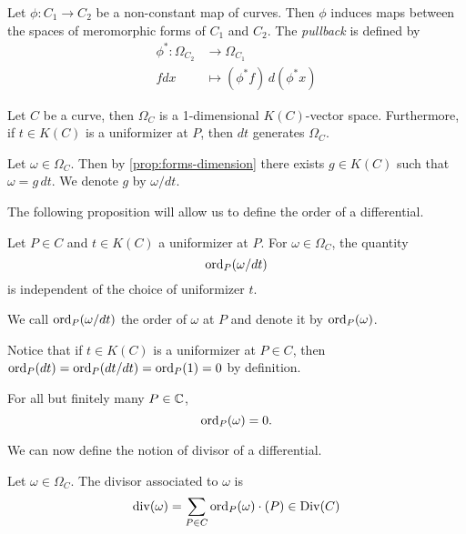 \begin{definition}
	Let $\phi: C_1 \to C_2$ be a non-constant map of curves. Then $\phi$ induces
	maps between the spaces of meromorphic forms of $C_1$ and $C_2$.
	The \emph{pullback} is defined by
	\begin{align*}
		\phi^*: \Omega_{C_2} &\to \Omega_{C_1}\\
		fdx &\mapsto (\phi^* f)\,d(\phi^* x)
	\end{align*}
\end{definition}

\begin{proposition}
	\label{prop:forms-dimension}
	Let $C$ be a curve, then $\Omega_C$ is a 1-dimensional $K(C)$-vector space.
	Furthermore, if $t \in K(C)$ is a uniformizer at $P$,
	then $dt$ generates $\Omega_C$.
\end{proposition}

\begin{notation}
	Let $\omega \in \Omega_C$. Then by \ref{prop:forms-dimension} there exists
	$g \in K(C)$ such that $\omega = g\,dt$. We denote $g$ by $\omega/dt$.
\end{notation}

The following proposition will allow us to define the order of a differential.
\begin{proposition}
	Let $P \in C$ and $t \in K(C)$ a uniformizer at $P$. For $\omega \in
	\Omega_C$,
	the quantity
	\begin{equation*}
		\operatorname{ord}_P(\omega/dt)
	\end{equation*}
	is independent of the choice of uniformizer $t$.
\end{proposition}

\begin{definition}
	We call $\operatorname{ord}_P(\omega/dt)$ the order of $\omega$ at $P$ and denote it by
	$\operatorname{ord}_P(\omega)$.
\end{definition}

Notice that if $t \in K(C)$ is a uniformizer at $P \in C$, then
$\operatorname{ord}_P(dt) = \operatorname{ord}_P(dt/dt) = \operatorname{ord}_P(1) = 0$ by definition.


\begin{proposition}
	For all but finitely many $P \in \mathbb{C}$, 
	\begin{equation*}
		\operatorname{ord}_P(\omega) = 0.
	\end{equation*}
\end{proposition}

We can now define the notion of divisor of a differential.
\begin{definition}
	Let $\omega \in \Omega_C$. The divisor associated to $\omega$ is
	\begin{equation*}
		\operatorname{div}(\omega) = \sum_{P \in C} \operatorname{ord}_P(\omega)\cdot (P) \in \operatorname{Div}(C)
	\end{equation*}
\end{definition}

